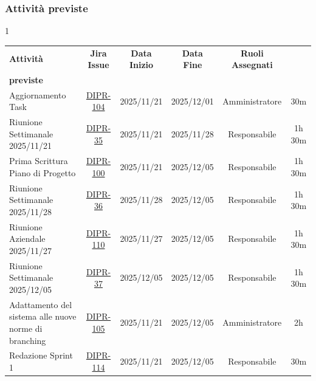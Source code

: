 \documentclass[a4paper,12pt]{article}
\begin{document}
\setlength{\LTleft}{-0,4cm}
\setlength{\LTleft}{-0,4cm}
\subsubsection{Attività previste}

    \small
    \begin{spacing}{1}
        \begin{longtable}{|p{4cm}|c|c|c|c|c|}
            \hline
            \rowcolor{zpusgreen!30}
            \textbf{Attività} & \textbf{Jira Issue} & \textbf{Data Inizio} & \textbf{Data Fine} & \textbf{Ruoli Assegnati} & \begin{tabular}[c]{@{}c@{}} \textbf{Ore} \\ \textbf{previste} \end{tabular} \\
            \hline
            Aggiornamento Task & \href{https://7zpus.atlassian.net/browse/DIPR-104}{DIPR-104} & 2025/11/21 & 2025/12/01 & Amministratore & 30m \\
            \hline
            Riunione Settimanale 2025/11/21 & \href{https://7zpus.atlassian.net/browse/DIPR-35}{DIPR-35} & 2025/11/21 & 2025/11/28 & Responsabile & 1h 30m\\
            \hline
            Prima Scrittura Piano di Progetto & \href{https://7zpus.atlassian.net/browse/DIPR-100}{DIPR-100} & 2025/11/21 & 2025/12/05 & Responsabile & 1h 30m\\
            \hline
            Riunione Settimanale 2025/11/28 & \href{https://7zpus.atlassian.net/browse/DIPR-36}{DIPR-36} & 2025/11/28 & 2025/12/05 & Responsabile & 1h 30m \\
            \hline
            Riunione Aziendale 2025/11/27 & \href{https://7zpus.atlassian.net/browse/DIPR-110}{DIPR-110} & 2025/11/27 & 2025/12/05 & Responsabile & 1h 30m \\ %
            \hline
            Riunione Settimanale 2025/12/05 & \href{https://7zpus.atlassian.net/browse/DIPR-37}{DIPR-37} & 2025/12/05 & 2025/12/05 & Responsabile & 1h 30m \\ 
            \hline
            Adattamento del sistema alle nuove norme di branching & \href{https://7zpus.atlassian.net/browse/DIPR-105}{DIPR-105} & 2025/11/21 & 2025/12/05 & Amministratore & 2h \\ %
            \hline
            Redazione Sprint 1 & \href{https://7zpus.atlassian.net/browse/DIPR-114}{DIPR-114} & 2025/11/21 & 2025/12/05 & Responsabile & 30m \\

\end{longtable}
\end{spacing}
\end{document}
